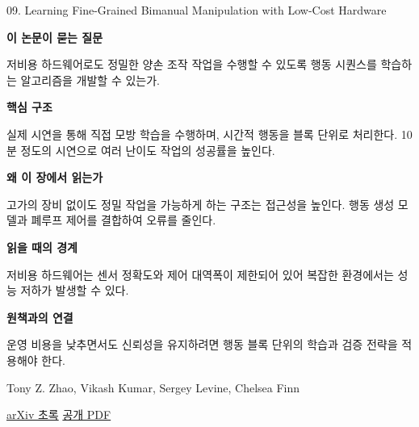 \documentclass[11pt,openany]{book}
\begin{document}
\begin{termcard}{09. Learning Fine-Grained Bimanual Manipulation with Low-Cost Hardware}

\par

\medskip

{\sffamily\bfseries\color{deepblue} 이 논문이 묻는 질문}\par

저비용 하드웨어로도 정밀한 양손 조작 작업을 수행할 수 있도록 행동 시퀀스를 학습하는 알고리즘을 개발할 수 있는가.

\smallskip

{\sffamily\bfseries\color{deepblue} 핵심 구조}\par

실제 시연을 통해 직접 모방 학습을 수행하며, 시간적 행동을 블록 단위로 처리한다. 10 분 정도의 시연으로 여러 난이도 작업의 성공률을 높인다.

\smallskip

{\sffamily\bfseries\color{deepblue} 왜 이 장에서 읽는가}\par

고가의 장비 없이도 정밀 작업을 가능하게 하는 구조는 접근성을 높인다. 행동 생성 모델과 폐루프 제어를 결합하여 오류를 줄인다.

\smallskip

{\sffamily\bfseries\color{coral} 읽을 때의 경계}\par

저비용 하드웨어는 센서 정확도와 제어 대역폭이 제한되어 있어 복잡한 환경에서는 성능 저하가 발생할 수 있다.

\smallskip

{\sffamily\bfseries\color{teal} 원책과의 연결}\par

운영 비용을 낮추면서도 신뢰성을 유지하려면 행동 블록 단위의 학습과 검증 전략을 적용해야 한다.

\medskip

{\footnotesize\color{muted} Tony Z. Zhao, Vikash Kumar, Sergey Levine, Chelsea Finn\par

\href{https://arxiv.org/abs/2304.13705}{arXiv 초록} \quad \href{https://arxiv.org/pdf/2304.13705}{공개 PDF}\par}

\end{termcard}
\end{document}
